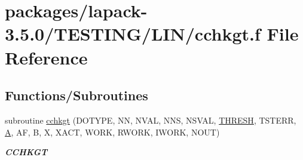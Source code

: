 \hypertarget{cchkgt_8f}{}\section{packages/lapack-\/3.5.0/\+T\+E\+S\+T\+I\+N\+G/\+L\+I\+N/cchkgt.f File Reference}
\label{cchkgt_8f}
\subsection*{Functions/\+Subroutines}
\begin{DoxyCompactItemize}
\item 
subroutine \hyperlink{group__complex__lin_gad46e64ec16238cce89b3b7af84d965dd}{cchkgt} (D\+O\+T\+Y\+P\+E, N\+N, N\+V\+A\+L, N\+N\+S, N\+S\+V\+A\+L, \hyperlink{zlaqgs_8c_a0656018abfc9fa2821827415f5d5ea57}{T\+H\+R\+E\+S\+H}, T\+S\+T\+E\+R\+R, \hyperlink{classA}{A}, A\+F, B, X, X\+A\+C\+T, W\+O\+R\+K, R\+W\+O\+R\+K, I\+W\+O\+R\+K, N\+O\+U\+T)
\begin{DoxyCompactList}\small\item\em {\bfseries C\+C\+H\+K\+G\+T} \end{DoxyCompactList}\end{DoxyCompactItemize}
